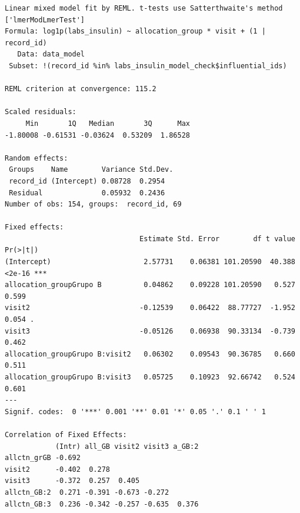 \documentclass[
  12pt,
]{article}
\newenvironment{Shaded}{\begin{snugshade}}{\end{snugshade}}
\newcommand{\NormalTok}[1]{\textcolor[rgb]{0.00,0.23,0.31}{#1}}
\newcommand{\SpecialCharTok}[1]{\textcolor[rgb]{0.37,0.37,0.37}{#1}}
\begin{document}
\begin{verbatim}
Linear mixed model fit by REML. t-tests use Satterthwaite's method ['lmerModLmerTest']
Formula: log1p(labs_insulin) ~ allocation_group * visit + (1 | record_id)
   Data: data_model
 Subset: !(record_id %in% labs_insulin_model_check$influential_ids)

REML criterion at convergence: 115.2

Scaled residuals: 
     Min       1Q   Median       3Q      Max 
-1.80008 -0.61531 -0.03624  0.53209  1.86528 

Random effects:
 Groups    Name        Variance Std.Dev.
 record_id (Intercept) 0.08728  0.2954  
 Residual              0.05932  0.2436  
Number of obs: 154, groups:  record_id, 69

Fixed effects:
                                Estimate Std. Error        df t value Pr(>|t|)    
(Intercept)                      2.57731    0.06381 101.20590  40.388   <2e-16 ***
allocation_groupGrupo B          0.04862    0.09228 101.20590   0.527    0.599    
visit2                          -0.12539    0.06422  88.77727  -1.952    0.054 .  
visit3                          -0.05126    0.06938  90.33134  -0.739    0.462    
allocation_groupGrupo B:visit2   0.06302    0.09543  90.36785   0.660    0.511    
allocation_groupGrupo B:visit3   0.05725    0.10923  92.66742   0.524    0.601    
---
Signif. codes:  0 '***' 0.001 '**' 0.01 '*' 0.05 '.' 0.1 ' ' 1

Correlation of Fixed Effects:
            (Intr) all_GB visit2 visit3 a_GB:2
allctn_grGB -0.692                            
visit2      -0.402  0.278                     
visit3      -0.372  0.257  0.405              
allctn_GB:2  0.271 -0.391 -0.673 -0.272       
allctn_GB:3  0.236 -0.342 -0.257 -0.635  0.376
\end{verbatim}

\begin{Shaded}
\end{Shaded}
\end{document}
